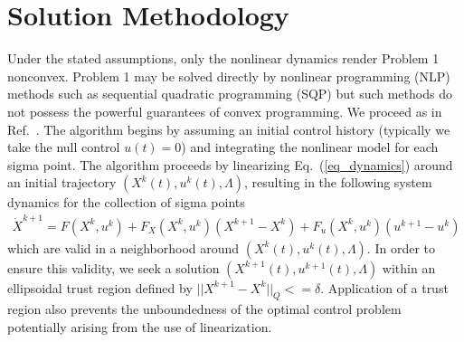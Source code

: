 \documentclass[10pt,a4paper]{article}
\begin{document}
	\section{Solution Methodology}
	Under the stated assumptions, only the nonlinear dynamics render Problem 1 nonconvex. Problem 1 may be solved directly by nonlinear programming (NLP) methods such as sequential quadratic programming (SQP) but such methods do not possess the powerful guarantees of convex programming.
	 We proceed as in Ref.~\cite{SuccConvex1}. The algorithm begins by assuming an initial control history (typically we take the null control $u(t)=0$) and integrating the nonlinear model for each sigma point. The algorithm proceeds by linearizing Eq.~(\ref{eq_dynamics}) around an initial trajectory $ (X^k(t),u^k(t),\Lambda) $, resulting in the following system dynamics for the collection of sigma points
	\begin{align}
	\dot{X}^{k+1} = F(X^{k},u^k) + F_X(X^k,u^k)(X^{k+1}-X^k) + F_u(X^k,u^k)(u^{k+1}-u^k) \label{eq_linearized}
	\end{align}
	which are valid in a neighborhood around $ (X^k(t),u^k(t),\Lambda) $. In order to ensure this validity, we seek a solution $ (X^{k+1}(t),u^{k+1}(t),\Lambda) $ within an ellipsoidal trust region defined by $||X^{k+1}-X^k||_Q <= \delta$. Application of a trust region also prevents the unboundedness of the optimal control problem potentially arising from the use of linearization.\cite{SuccConvex1} 
	
	
		
\end{document}
